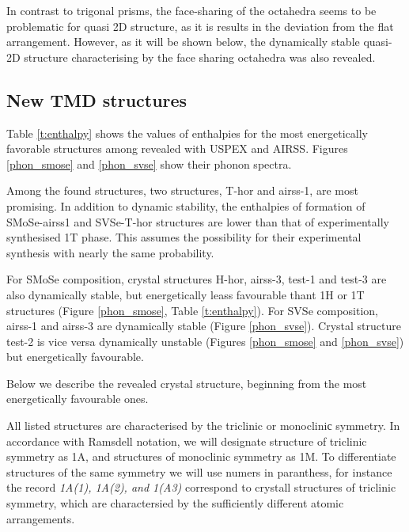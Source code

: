 \documentclass[a4paperm]{article}
\begin{document}
In contrast to trigonal prisms, the face-sharing of the octahedra seems to be problematic for quasi 2D structure, as it is results in the deviation from the flat arrangement.
However, as it will be shown below, the dynamically stable quasi-2D structure characterising by the face sharing octahedra was also revealed.



		\subsection{New TMD structures}

Table \ref{t:enthalpy} shows the values of enthalpies for the most energetically favorable structures among revealed with USPEX and AIRSS.
 Figures \ref{phon_smose} and  \ref{phon_svse} show their phonon spectra. 
 
Among the found structures, two structures, T-hor and airss-1, are most promising.
In addition to dynamic stability, the enthalpies of formation of SMoSe-airss1 and SVSe-T-hor structures are lower than that of experimentally synthesised 1T phase.
This assumes the possibility for their experimental synthesis with nearly the same probability.

For SMoSe composition, crystal structures H-hor, airss-3, test-1 and test-3 are also dynamically stable, but energetically leass favourable thant 1H or 1T structures (Figure \ref{phon_smose}, Table \ref{t:enthalpy}).
For SVSe composition, airss-1 and airss-3 are dynamically stable (Figure \ref{phon_svse}).
Crystal structure test-2 is vice versa dynamically unstable (Figures \ref{phon_smose} and \ref{phon_svse}) but energetically favourable. 

Below we describe the revealed crystal structure, beginning from the most energetically favourable ones.

All listed structures are characterised by the triclinic or monocliniс symmetry.
In accordance with Ramsdell notation, we will designate structure of triclinic symmetry as 1A, and structures of monoclinic symmetry as 1M.
To differentiate structures of the same symmetry we will use numers in paranthess, for instance the record {\it 1A(1), 1A(2), and 1(A3)}  correspond to crystall structures of triclinic symmetry, which are charactersied by the sufficiently different atomic arrangements.

\end{document}
